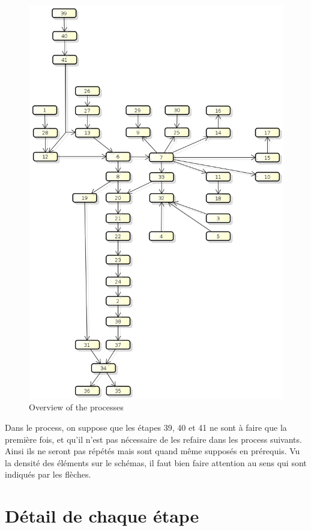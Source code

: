 \documentclass{article}
\begin{document}
\begin{figure}[h]
\includegraphics[scale=0.6]{image/process_vishnu.png}
\caption{Overview of the processes}
\end{figure}

Dans le process, on suppose que les étapes 39, 40 et 41 ne sont à faire que la première fois, 
et qu'il n'est pas nécessaire de les refaire dans les process suivants. Ainsi ils ne seront 
pas répétés mais sont quand même supposés en prérequis.
Vu la densité des éléments sur le schémas, il faut bien faire attention au sens qui sont 
indiqués par les flèches.

\section{Détail de chaque étape}
\end{document}
